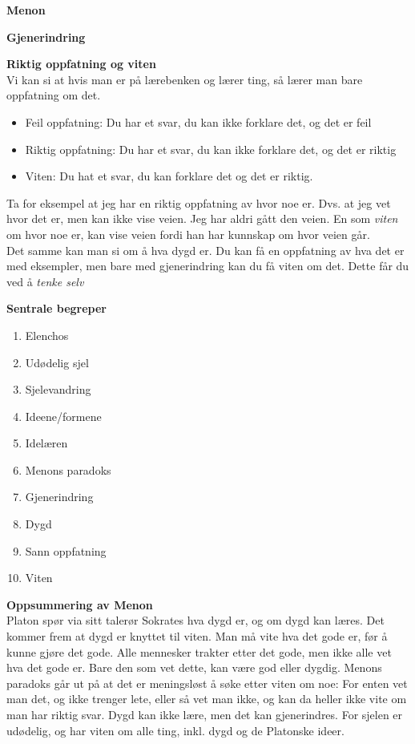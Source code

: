 \documentclass[11pt, a4paper]{article}
\newenvironment{sectionbox}[1][]{%
    \begin{sectionboxinner}
    \textbf{\large #1}
    \vspace{1pt}
    \newline
}{%
    \end{sectionboxinner}
}
\newenvironment{subsectionbox}[1][]{%
    \begin{subsectionboxinner}
        {\bfseries #1}\\[-2pt]
}{%
    \end{subsectionboxinner}
}
\begin{document}
\begin{sectionbox}[Menon]
\begin{subsectionbox}[Gjenerindring]
\end{subsectionbox}


\begin{subsectionbox}[Riktig oppfatning og viten]

Vi kan si at hvis man er på lærebenken og lærer ting, så lærer man bare oppfatning om det. 
\begin{itemize}
    \item Feil oppfatning: Du har et svar, du kan ikke forklare det, og det er feil
    \item Riktig oppfatning: Du har et svar, du kan ikke forklare det, og det er riktig
    \item Viten: Du hat et svar, du kan forklare det og det er riktig.
\end{itemize}

Ta for eksempel at jeg har en riktig oppfatning av hvor noe er. Dvs. at jeg vet hvor det er, men kan ikke vise veien. Jeg har aldri gått den veien. En som \textit{viten} om hvor noe er, kan vise veien fordi han har kunnskap om hvor veien går.\\

Det samme kan man si om å hva dygd er. Du kan få en oppfatning av hva det er med eksempler, men bare med gjenerindring kan du få viten om det. Dette får du ved å \textit{tenke selv}

\end{subsectionbox}

\begin{subsectionbox}[Sentrale begreper]
\begin{enumerate}
    \item Elenchos
    \item Udødelig sjel
    \item Sjelevandring
    \item Ideene/formene
    \item Idelæren
    \item Menons paradoks
    \item Gjenerindring
    \item Dygd
    \item Sann oppfatning
    \item Viten
\end{enumerate}
\end{subsectionbox}
\begin{subsectionbox}[Oppsummering av Menon]
Platon spør via sitt talerør Sokrates hva dygd er, og om dygd kan læres. Det kommer frem at dygd er knyttet til viten. Man må vite hva det gode er, før å kunne gjøre det gode. Alle mennesker trakter etter det gode, men ikke alle vet hva det gode er. Bare den som vet dette, kan være god eller dygdig. Menons paradoks går ut på at det er meningsløst å søke etter viten om noe: For enten vet man det, og ikke trenger lete, eller så vet man ikke, og kan da heller ikke vite om man har riktig svar. Dygd kan ikke lære, men det kan gjenerindres. For sjelen er udødelig, og har viten om alle ting, inkl. dygd og de Platonske ideer.
\end{subsectionbox}

\end{sectionbox}
\end{document}
